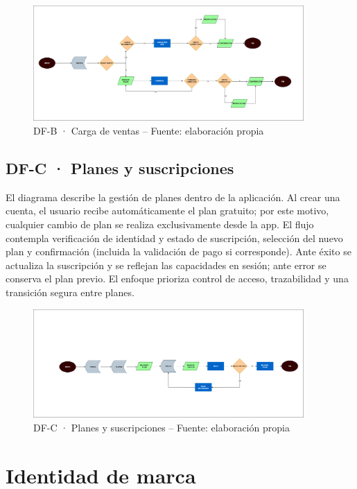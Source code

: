 \begin{figure}[!htbp]
  \centering
  \includegraphics[width=0.92\textwidth]{images/FlujoVentas.drawio.png}
  \caption{DF-B · Carga de ventas -- Fuente: elaboración propia}
  \label{fig:df-b-ventas}
\end{figure}


\subsection{DF-C · Planes y suscripciones}
El diagrama describe la gestión de planes dentro de la aplicación. Al crear una cuenta, el usuario recibe automáticamente el plan gratuito; por este motivo, cualquier cambio de plan se realiza exclusivamente desde la app. El flujo contempla verificación de identidad y estado de suscripción, selección del nuevo plan y confirmación (incluida la validación de pago si corresponde). Ante éxito se actualiza la suscripción y se reflejan las capacidades en sesión; ante error se conserva el plan previo. El enfoque prioriza control de acceso, trazabilidad y una transición segura entre planes.

\begin{figure}[!htbp]
  \centering
  \includegraphics[width=0.92\textwidth]{images/FlujoPlanes.drawio.png}
  \caption{DF-C · Planes y suscripciones -- Fuente: elaboración propia}
  \label{fig:df-c-planes}
\end{figure}


\vspace{1cm}
\section{Identidad de marca}\label{sec:brand}

